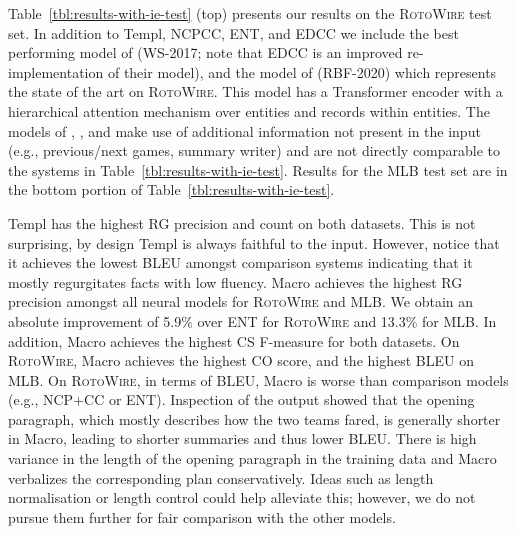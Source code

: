 \documentclass[11pt,a4paper]{article}
\begin{document}
Table~\ref{tbl:results-with-ie-test} (top) presents our results on the
\textsc{RotoWire} test set.
In addition to Templ, NCPCC, ENT, and EDCC we include the best
performing model of \citet{wiseman-etal-2017-challenges} (WS-2017;
note that EDCC is an improved re-implementation of their model), and
the model of \citet{rebuffel2020hierarchical} (RBF-2020) which
represents the state of the art on \textsc{RotoWire}. This model has
a Transformer encoder \cite{NIPS2017_7181} with a hierarchical
attention mechanism over entities and records within entities.
The models of \citet{saleh-etal-2019-naver},
\citet{iso-etal-2019-learning}, and \citet{gong-etal-2019-table} make
use of additional information not present in the input (e.g.,
previous/next games, summary writer) and are not directly comparable
to the systems in Table~\ref{tbl:results-with-ie-test}.  Results for
the MLB test set are in the bottom portion of
Table~\ref{tbl:results-with-ie-test}.

Templ has the highest RG precision and count on both datasets.  This
is not surprising, by design Templ is always faithful to the
input. However, notice that it achieves the lowest BLEU amongst
comparison systems indicating that it mostly regurgitates facts with
low fluency. Macro achieves the highest RG precision amongst all
neural models for \textsc{RotoWire} and MLB. We obtain an absolute
improvement of 5.9\% over ENT for \textsc{RotoWire} and 13.3\% for
MLB. In addition, Macro achieves the highest CS F-measure for both
datasets. On \textsc{RotoWire}, Macro achieves the highest CO score,
and the highest BLEU on MLB.  On \textsc{RotoWire}, in terms of BLEU,
Macro is worse than comparison models (e.g., NCP+CC or
ENT). Inspection of the output showed that the opening paragraph,
which mostly describes how the two teams fared, is generally shorter
in Macro, leading to shorter summaries and thus lower BLEU. There is
high variance in the length of the opening paragraph in the training
data
and Macro verbalizes the corresponding plan conservatively. Ideas such
as length normalisation \cite{DBLP:journals/corr/WuSCLNMKCGMKSJL16} or length control
\cite{kikuchi-etal-2016-controlling,takeno-etal-2017-controlling,fan-etal-2018-controllable}
could help alleviate this; however, we do not pursue them further for
fair comparison with the other models.
\end{document}
